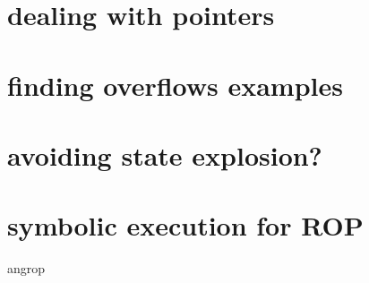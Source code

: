 \section{dealing with pointers}



\section{finding overflows examples}


\section{avoiding state explosion?}

\section{symbolic execution for ROP}
\begin{frame}{angrop}
\end{frame}

